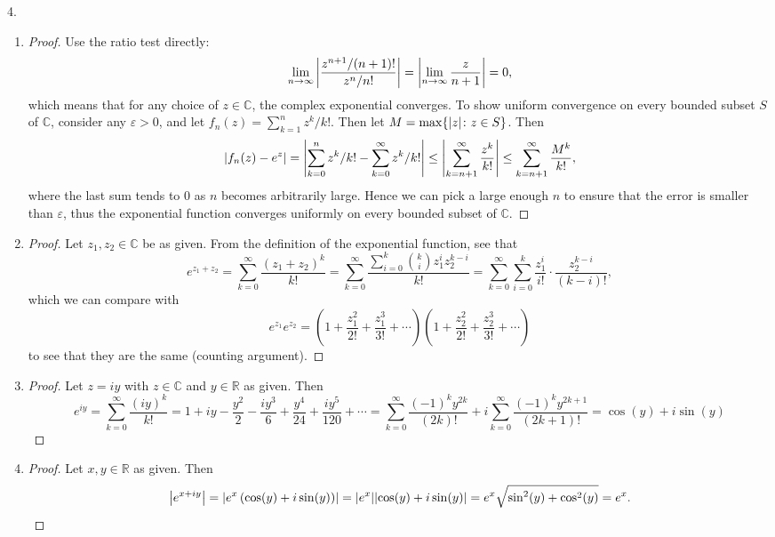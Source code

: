 \documentclass[11pt]{article}
\newcommand{\br}[1]{\left(#1\right)}
\begin{document}
4. \begin{enumerate}[label=(\alph*)]
  \item \begin{proof}
    Use the ratio test directly: \[\lim_{n\to\infty}\abs{\frac{z^{n+1}/(n+1)!}{z^n/n!}} = \abs{\lim_{n\to\infty}\frac{z}{n+1}} = 0,\] which means that for any choice of $z\in\mathbb{C}$, the complex exponential converges. To show uniform convergence on every bounded subset $S$ of $\mathbb{C}$, consider any $\varepsilon >0$, and let $f_n(z) = \sum_{k=1}^n z^k/k!$. Then let $M = \max\{ \abs{z}\colon z\in S\}$. Then \[\abs{f_n(z)-e^z} = \abs{\sum_{k=0}^n z^k/k! - \sum_{k=0}^{\infty} z^k/k!}\leq \abs{\sum_{k=n+1}^{\infty}\frac{z^k}{k!}}\leq \sum_{k=n+1}^{\infty}\frac{M^k}{k!},\] where the last sum tends to $0$ as $n$ becomes arbitrarily large. Hence we can pick a large enough $n$ to ensure that the error is smaller than $\varepsilon$, thus the exponential function converges uniformly on every bounded subset of $\mathbb{C}$.
  \end{proof}

  \item \begin{proof}
    Let $z_1,z_2\in\mathbb{C}$ be as given. From the definition of the exponential function, see that \[e^{z_1+z_2} = \sum_{k=0}^{\infty}\frac{(z_1+z_2)^k}{k!} = \sum_{k=0}^{\infty}\frac{\sum_{i=0}^k\binom{k}{i}z_1^iz_2^{k-i}}{k!} = \sum_{k=0}^{\infty}\sum_{i=0}^k\frac{z_1^i}{i!}\cdot\frac{z_2^{k-i}}{(k-i)!},\] which we can compare with \[e^{z_1}e^{z_2} = \br{1 + \frac{z_1^2}{2!} + \frac{z_1^3}{3!} + \cdots}\br{1 + \frac{z_2^2}{2!} + \frac{z_2^3}{3!} + \cdots}\] to see that they are the same (counting argument).
  \end{proof}

  \item \begin{proof}
    Let $z = iy$ with $z\in\mathbb{C}$ and $y\in \mathbb{R}$ as given. Then \[e^{iy} = \sum_{k=0}^\infty \frac{(iy)^k}{k!} = 1+iy-\frac{y^2}{2} - \frac{iy^3}{6} + \frac{y^4}{24} + \frac{iy^5}{120} + \cdots = \sum_{k=0}^\infty\frac{(-1)^ky^{2k}}{(2k)!}+i\sum_{k=0}^\infty\frac{(-1)^ky^{2k+1}}{(2k+1)!} = \cos(y) + i\sin(y)\]
  \end{proof}

  \item \begin{proof}
    Let $x,y\in\mathbb{R}$ as given. Then \[\abs{e^{x+iy}} = \abs{e^x\br{\cos(y) + i\sin(y)}} = \abs{e^x}\abs{\cos(y) + i\sin(y)} = e^x\sqrt{\sin^2(y) + \cos^2(y)} = e^x.\]
  \end{proof}


\end{enumerate}
\end{document}
